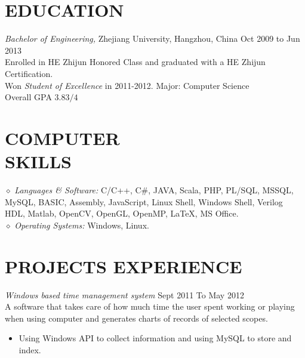 \documentclass[line,margin]{res}
\begin{document}
\address{Cellphone:\sl 15216861267}
\address{E-mail:\sl me@daoyuan.wang}


\begin{resume}


\section{EDUCATION} {\sl Bachelor of Engineering,} Zhejiang University, Hangzhou, China \hfill Oct 2009 to Jun 2013\\
                Enrolled in HE Zhijun Honored Class and graduated with a HE Zhijun Certification.\\
                Won {\sl Student of Excellence} in 2011-2012.
                Major: Computer Science \\
                Overall GPA $3.83/4$

\section{COMPUTER \\ SKILLS} {$\diamond$ \sl Languages \& Software:} C/C++, C\#, JAVA, Scala, PHP, PL/SQL, MSSQL, MySQL, BASIC, Assembly, JavaScript, Linux Shell, Windows Shell, Verilog HDL, Matlab, OpenCV, OpenGL, OpenMP, \LaTeX, MS Office. \\
                {$\diamond$ \sl Operating Systems:} Windows, Linux.

\section{PROJECTS EXPERIENCE} {\sl Windows based time management system} \hfill Sept 2011 To May 2012 \\
                A software that takes care of how much time the user spent working or playing when using computer and generates charts of records of selected scopes.
                 \begin{itemize}  \itemsep -2pt %
                 \item Using Windows API to collect information and using MySQL to store and index.
                 \end{itemize}


\end{resume}
\end{document}
